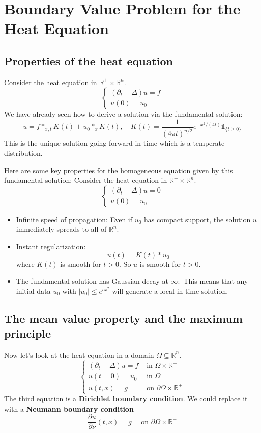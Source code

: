 \newpage
\section{Boundary Value Problem for the Heat Equation}

\subsection{Properties of the heat equation}
Consider the heat equation in $\mathbb{R}^{+} \times \mathbb{R}^{n}$.
$$
\left\{\begin{array}{l}
\left(\partial_{t}-\Delta\right) u=f \\
u(0)=u_{0}
\end{array}\right.
$$
We have already seen how to derive a solution via the fundamental solution:
$$
u=f *_{x, t} K(t)+u_{0} *_{x} K(t), \quad K(t)=\frac{1}{(4 \pi t)^{n / 2}} e^{-x^{2} /(4 t)} \mathbb{1}_{\{t \geq 0\}}
$$
This is the unique solution going forward in time which is a temperate distribution.

Here are some key properties for the homogeneous equation given by this fundamental solution: Consider the heat equation in $\mathbb{R}^{+} \times \mathbb{R}^{n}$.
$$
\left\{\begin{array}{l}
\left(\partial_{t}-\Delta\right) u=0 \\
u(0)=u_{0}
\end{array}\right.
$$

\begin{itemize}
    \item Infinite speed of propagation: Even if $u_{0}$ has compact support, the solution $u$ immediately spreads to all of $\mathbb{R}^{n}$.
    \item Instant regularization:
    $$
    u(t)=K(t) * u_{0}
    $$
    where $K(t)$ is smooth for $t>0$. So $u$ is smooth for $t>0$.
    \item The fundamental solution has Gaussian decay at $\infty:$ This means that any initial data $u_{0}$ with $\left|u_{0}\right| \leq e^{c x^{2}}$ will generate a local in time solution.
\end{itemize}

\subsection{The mean value property and the maximum principle}
Now let's look at the heat equation in a domain $\Omega \subseteq \mathbb{R}^{n}$.
$$
\begin{cases}\left(\partial_{t}-\Delta\right) u=f & \text { in } \Omega \times \mathbb{R}^{+} \\ u(t=0)=u_{0} & \text { in } \Omega \\ u(t, x)=g & \text { on } \partial \Omega \times \mathbb{R}^{+}\end{cases}
$$
The third equation is a \textbf{Dirichlet boundary condition}. We could replace it with a \textbf{Neumann boundary condition}
$$
\frac{\partial u}{\partial \nu}(t, x)=g \quad \text { on } \partial \Omega \times \mathbb{R}^{+}
$$

